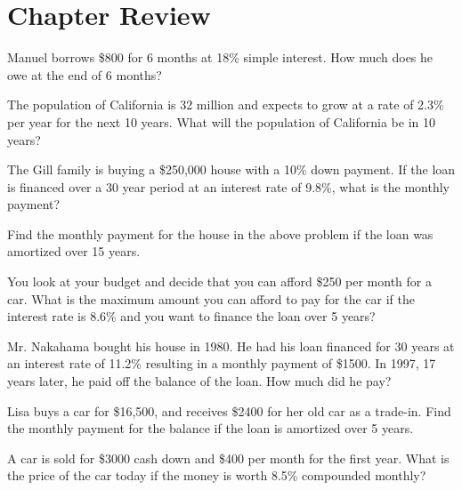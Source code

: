 \section{Chapter Review}

\begin{puzzle}
    Manuel borrows \$800 for 6 months at 18\% simple interest. How much does he owe at the end of 6 months?
\end{puzzle}

\begin{puzzle}
    The population of California is 32 million and expects to grow at a rate of 2.3\% per year for the next 10 years. What will the population of California be in 10 years?
\end{puzzle}

\begin{puzzle}
    The Gill family is buying a \$250,000 house with a 10\% down payment. If the loan is financed over a 30 year period at an interest rate of 9.8\%, what is the monthly payment?
\end{puzzle}

\begin{puzzle}
    Find the monthly payment for the house in the above problem if the loan was amortized over 15 years.
\end{puzzle}

\begin{puzzle}
    You look at your budget and decide that you can afford \$250 per month for a car. What is the maximum amount you can afford to pay for the car if the interest rate is 8.6\% and you want to finance the loan over 5 years?
\end{puzzle}

\begin{puzzle}
    Mr. Nakahama bought his house in 1980. He had his loan financed for 30 years at an interest rate of 11.2\% resulting in a monthly payment of \$1500. In 1997, 17 years later, he paid off the balance of the loan. How much did he pay?
\end{puzzle}

\begin{puzzle}
    Lisa buys a car for \$16,500, and receives \$2400 for her old car as a trade-in. Find the monthly payment for the balance if the loan is amortized over 5 years.
\end{puzzle}

\begin{puzzle}
    A car is sold for \$3000 cash down and \$400 per month for the first year. What is the price of the car today if the money is worth 8.5\% compounded monthly?
\end{puzzle}

